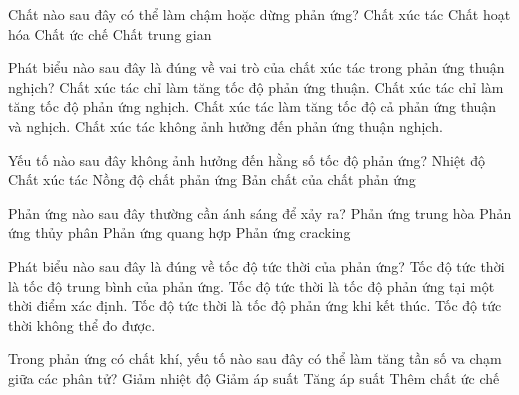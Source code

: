 \documentclass[Main.tex]{subfiles}
\begin{document}
\begin{ex}
	Chất nào sau đây có thể làm chậm hoặc dừng phản ứng?
	\choice
	{Chất xúc tác}
	{Chất hoạt hóa}
	{\True Chất ức chế}
	{Chất trung gian}
\end{ex}

\begin{ex}
	Phát biểu nào sau đây là đúng về vai trò của chất xúc tác trong phản ứng thuận nghịch?
	\choice
	{Chất xúc tác chỉ làm tăng tốc độ phản ứng thuận.}
	{Chất xúc tác chỉ làm tăng tốc độ phản ứng nghịch.}
	{\True Chất xúc tác làm tăng tốc độ cả phản ứng thuận và nghịch.}
	{Chất xúc tác không ảnh hưởng đến phản ứng thuận nghịch.}
\end{ex}

\begin{ex}
	Yếu tố nào sau đây không ảnh hưởng đến hằng số tốc độ phản ứng?
	\choice
	{Nhiệt độ}
	{Chất xúc tác}
	{\True Nồng độ chất phản ứng}
	{Bản chất của chất phản ứng}
\end{ex}

\begin{ex}
	Phản ứng nào sau đây thường cần ánh sáng để xảy ra?
	\choice
	{Phản ứng trung hòa}
	{Phản ứng thủy phân}
	{\True Phản ứng quang hợp}
	{Phản ứng cracking}
\end{ex}

\begin{ex}
	Phát biểu nào sau đây là đúng về tốc độ tức thời của phản ứng?
	\choice
	{Tốc độ tức thời là tốc độ trung bình của phản ứng.}
	{\True Tốc độ tức thời là tốc độ phản ứng tại một thời điểm xác định.}
	{Tốc độ tức thời là tốc độ phản ứng khi kết thúc.}
	{Tốc độ tức thời không thể đo được.}
\end{ex}

\begin{ex}
	Trong phản ứng có chất khí, yếu tố nào sau đây có thể làm tăng tần số va chạm giữa các phân tử?
	\choice
	{Giảm nhiệt độ}
	{Giảm áp suất}
	{\True Tăng áp suất}
	{Thêm chất ức chế}
\end{ex}
\end{document}
